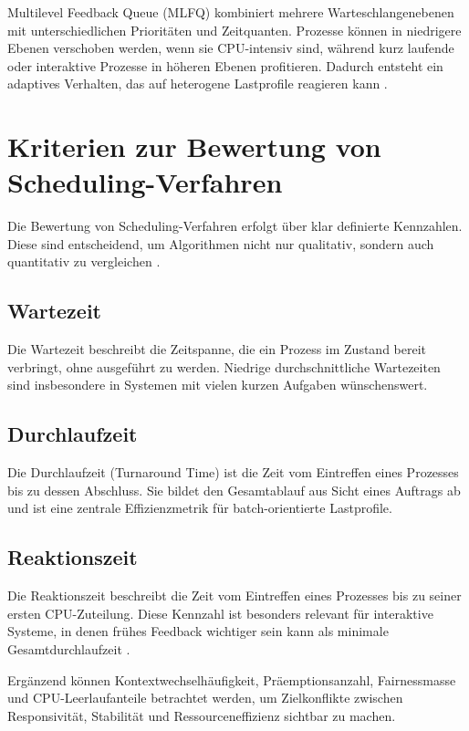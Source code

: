 Multilevel Feedback Queue (MLFQ) kombiniert mehrere Warteschlangenebenen mit unterschiedlichen Prioritäten und Zeitquanten. Prozesse können in niedrigere Ebenen verschoben werden, wenn sie CPU-intensiv sind, während kurz laufende oder interaktive Prozesse in höheren Ebenen profitieren. Dadurch entsteht ein adaptives Verhalten, das auf heterogene Lastprofile reagieren kann \cite{silberschatz2018operating,meing2025mlfq}.

\section{Kriterien zur Bewertung von Scheduling-Verfahren}

Die Bewertung von Scheduling-Verfahren erfolgt über klar definierte Kennzahlen. Diese sind entscheidend, um Algorithmen nicht nur qualitativ, sondern auch quantitativ zu vergleichen \cite{pinedo2016scheduling}.

\subsection{Wartezeit}

Die Wartezeit beschreibt die Zeitspanne, die ein Prozess im Zustand \glqq bereit\grqq{} verbringt, ohne ausgeführt zu werden. Niedrige durchschnittliche Wartezeiten sind insbesondere in Systemen mit vielen kurzen Aufgaben wünschenswert.

\subsection{Durchlaufzeit}

Die Durchlaufzeit (Turnaround Time) ist die Zeit vom Eintreffen eines Prozesses bis zu dessen Abschluss. Sie bildet den Gesamtablauf aus Sicht eines Auftrags ab und ist eine zentrale Effizienzmetrik für batch-orientierte Lastprofile.

\subsection{Reaktionszeit}

Die Reaktionszeit beschreibt die Zeit vom Eintreffen eines Prozesses bis zu seiner ersten CPU-Zuteilung. Diese Kennzahl ist besonders relevant für interaktive Systeme, in denen frühes Feedback wichtiger sein kann als minimale Gesamtdurchlaufzeit \cite{silberschatz2018operating,tanenbaum2014modern}.

Ergänzend können Kontextwechselhäufigkeit, Präemptionsanzahl, Fairnessmasse und CPU-Leerlaufanteile betrachtet werden, um Zielkonflikte zwischen Responsivität, Stabilität und Ressourceneffizienz sichtbar zu machen.
